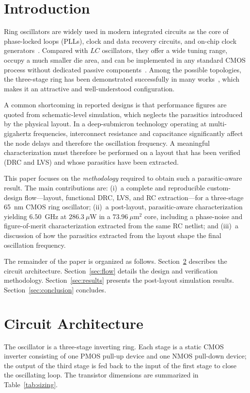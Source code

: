 \documentclass[conference]{IEEEtran}
\begin{document}
\section{Introduction}
Ring oscillators are widely used in modern integrated circuits as the core of
phase-locked loops (PLLs), clock and data recovery circuits, and on-chip clock
generators~\cite{razavi_book}. Compared with $LC$ oscillators, they offer a wide
tuning range, occupy a much smaller die area, and can be implemented in any
standard CMOS process without dedicated passive components~\cite{nugroho2012cco,
pokharel2011quadrature}. Among the possible topologies, the three-stage ring has
been demonstrated successfully in many works~\cite{nugroho2012cco}, which makes
it an attractive and well-understood configuration.

A common shortcoming in reported designs is that performance figures are quoted
from schematic-level simulation, which neglects the parasitics introduced by the
physical layout. In a deep-submicron technology operating at multi-gigahertz
frequencies, interconnect resistance and capacitance significantly affect the
node delays and therefore the oscillation frequency. A meaningful
characterization must therefore be performed on a layout that has been verified
(DRC and LVS) and whose parasitics have been extracted.

This paper focuses on the \emph{methodology} required to obtain such a
parasitic-aware result. The main contributions are: (i)~a complete and
reproducible custom-design flow---layout, functional DRC, LVS, and RC
extraction---for a three-stage 65~nm CMOS ring oscillator; (ii)~a post-layout,
parasitic-aware characterization yielding $6.50$~GHz at $286.3~\mu$W in a
$73.96~\mu$m$^2$ core, including a phase-noise and figure-of-merit
characterization extracted from the same RC netlist; and (iii)~a discussion of
how the parasitics extracted from the layout shape the final oscillation
frequency.

The remainder of the paper is organized as follows. Section~\ref{sec:arch}
describes the circuit architecture. Section~\ref{sec:flow} details the design
and verification methodology. Section~\ref{sec:results} presents the post-layout
simulation results. Section~\ref{sec:conclusion} concludes.

\section{Circuit Architecture}\label{sec:arch}
The oscillator is a three-stage inverting ring. Each stage is a static CMOS
inverter consisting of one PMOS pull-up device and one NMOS pull-down device;
the output of the third stage is fed back to the input of the first stage to
close the oscillating loop. The transistor dimensions are summarized in
Table~\ref{tab:sizing}.
\end{document}
